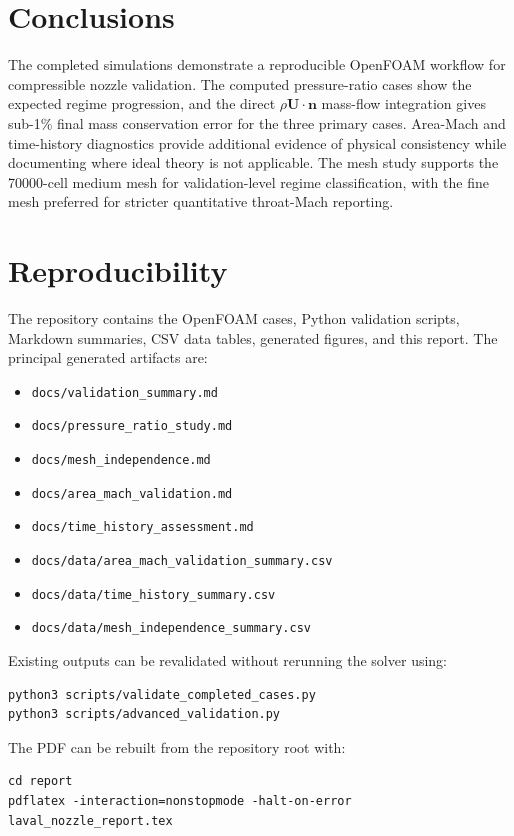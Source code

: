 \documentclass[11pt,a4paper]{article}
\begin{document}
\section{Conclusions}

The completed simulations demonstrate a reproducible OpenFOAM workflow for compressible nozzle validation. The computed pressure-ratio cases show the expected regime progression, and the direct \(\rho\mathbf{U}\cdot\mathbf{n}\) mass-flow integration gives sub-1\% final mass conservation error for the three primary cases. Area-Mach and time-history diagnostics provide additional evidence of physical consistency while documenting where ideal theory is not applicable. The mesh study supports the 70000-cell medium mesh for validation-level regime classification, with the fine mesh preferred for stricter quantitative throat-Mach reporting.

\section{Reproducibility}

The repository contains the OpenFOAM cases, Python validation scripts, Markdown summaries, CSV data tables, generated figures, and this report. The principal generated artifacts are:
\begin{itemize}
\item \texttt{docs/validation\_summary.md}
\item \texttt{docs/pressure\_ratio\_study.md}
\item \texttt{docs/mesh\_independence.md}
\item \texttt{docs/area\_mach\_validation.md}
\item \texttt{docs/time\_history\_assessment.md}
\item \texttt{docs/data/area\_mach\_validation\_summary.csv}
\item \texttt{docs/data/time\_history\_summary.csv}
\item \texttt{docs/data/mesh\_independence\_summary.csv}
\end{itemize}

Existing outputs can be revalidated without rerunning the solver using:
\begin{verbatim}
python3 scripts/validate_completed_cases.py
python3 scripts/advanced_validation.py
\end{verbatim}
The PDF can be rebuilt from the repository root with:
\begin{verbatim}
cd report
pdflatex -interaction=nonstopmode -halt-on-error laval_nozzle_report.tex
\end{verbatim}
\end{document}
